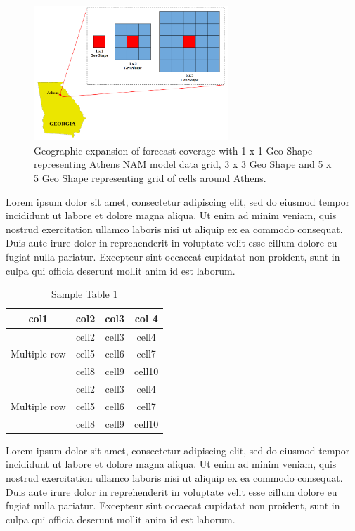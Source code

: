\begin{figure}[htbp]
    \begin{center}
    	\includegraphics[width=0.65\textwidth]{chapter3/fig_geoshapes.png}
    	\caption[Geographic expansion of forecast coverage around Athens NAM model data grid]{Geographic expansion of forecast coverage with 1 x 1 Geo Shape representing Athens NAM model data grid, 3 x 3 Geo Shape and 5 x 5 Geo Shape representing grid of cells around Athens.}
    	\label{fig:fig_geoshapes}
    \end{center}
\end{figure}

Lorem ipsum dolor sit amet, consectetur adipiscing elit, sed do eiusmod tempor incididunt ut labore et dolore magna aliqua. Ut enim ad minim veniam, quis nostrud exercitation ullamco laboris nisi ut aliquip ex ea commodo consequat. Duis aute irure dolor in reprehenderit in voluptate velit esse cillum dolore eu fugiat nulla pariatur. Excepteur sint occaecat cupidatat non proident, sunt in culpa qui officia deserunt mollit anim id est laborum.

\begin{table}[h]
\begin{center}
    \caption{Sample Table 1}
    \begin{tabular}{ c c c c }
    	\toprule
    	col1 & col2 & col3 & col 4 \\
    	\midrule
    	\multirow{3}{4em}{Multiple row} & cell2 & cell3 & cell4\\ &
    	cell5 & cell6 & cell7 \\ &
    	cell8 & cell9 & cell10 \\
    	\midrule
    	\multirow{3}{4em}{Multiple row} & cell2 & cell3 & cell4 \\ &
    	cell5 & cell6 & cell7 \\ &
    	cell8 & cell9 & cell10 \\
    	\bottomrule
    \end{tabular}
\end{center}
\end{table}

Lorem ipsum dolor sit amet, consectetur adipiscing elit, sed do eiusmod tempor incididunt ut labore et dolore magna aliqua. Ut enim ad minim veniam, quis nostrud exercitation ullamco laboris nisi ut aliquip ex ea commodo consequat. Duis aute irure dolor in reprehenderit in voluptate velit esse cillum dolore eu fugiat nulla pariatur. Excepteur sint occaecat cupidatat non proident, sunt in culpa qui officia deserunt mollit anim id est laborum.

\newpage